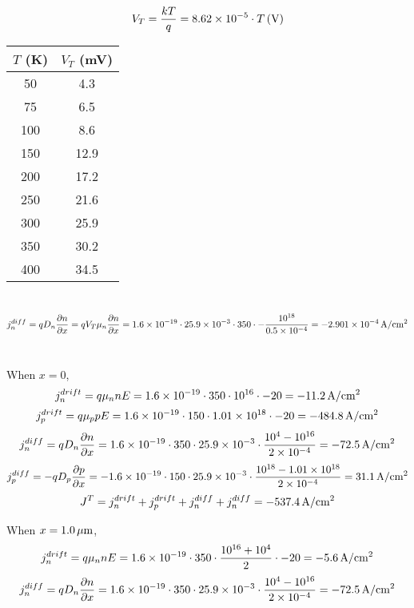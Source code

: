 \documentclass{article}
\newcommand{\unit}[1]{{\rm\,#1}}
\begin{document}
\section{}
$$V_T=\frac{kT}{q}=8.62\times10^{-5}\cdot T\unit{(V)}$$
\begin{center}
\begin{tabular}{|c|c|}
\hline
$T$ (K) & $V_T$ (mV) \\\hline
50 & 4.3\\\hline
75 & 6.5\\\hline
100 & 8.6\\\hline
150 & 12.9\\\hline
200 & 17.2\\\hline
250 & 21.6\\\hline
300 & 25.9\\\hline
350 & 30.2\\\hline
400 & 34.5\\\hline
\end{tabular}
\end{center}

\section{}
$$j_n^{diff}=qD_n\frac{\partial n}{\partial x}=qV_T\mu_n\frac{\partial n}{\partial x}=1.6\times10^{-19}\cdot25.9\times10^{-3}\cdot350\cdot-\frac{10^{18}}{0.5\times10^{-4}}=-2.901\times10^{-4}\unit{A/cm^2}$$

\section{}
When $x=0$,
$$j_n^{drift}=q\mu_nnE=1.6\times10^{-19}\cdot350\cdot10^{16}\cdot-20=-11.2\unit{A/cm^2}$$
$$j_p^{drift}=q\mu_ppE=1.6\times10^{-19}\cdot150\cdot1.01\times10^{18}\cdot-20=-484.8\unit{A/cm^2}$$
$$j_n^{diff}=qD_n\frac{\partial n}{\partial x}=1.6\times10^{-19}\cdot350\cdot25.9\times10^{-3}\cdot\frac{10^4-10^{16}}{2\times10^{-4}}=-72.5\unit{A/cm^2}$$
$$j_p^{diff}=-qD_p\frac{\partial p}{\partial x}=-1.6\times10^{-19}\cdot150\cdot25.9\times10^{-3}\cdot\frac{10^{18}-1.01\times10^{18}}{2\times10^{-4}}=31.1\unit{A/cm^2}$$
$$J^T=j_n^{drift}+j_p^{drift}+j_n^{diff}+j_n^{diff}=-537.4\unit{A/cm^2}$$

When $x=1.0\unit{\mu m}$,
$$j_n^{drift}=q\mu_nnE=1.6\times10^{-19}\cdot350\cdot\frac{10^{16}+10^4}{2}\cdot-20=-5.6\unit{A/cm^2}$$
$$j_n^{diff}=qD_n\frac{\partial n}{\partial x}=1.6\times10^{-19}\cdot350\cdot25.9\times10^{-3}\cdot\frac{10^4-10^{16}}{2\times10^{-4}}=-72.5\unit{A/cm^2}$$
\end{document}
